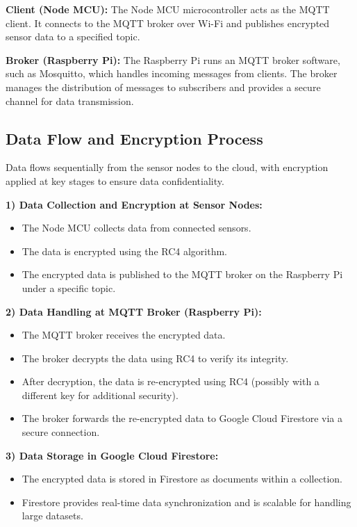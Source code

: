 \documentclass[conference]{IEEEtran}
\begin{document}
\textbf{Client (Node MCU):} The Node MCU microcontroller acts as the MQTT client. It connects to the MQTT broker over Wi-Fi and publishes encrypted sensor data to a specified topic.

\textbf{Broker (Raspberry Pi):} The Raspberry Pi runs an MQTT broker software, such as Mosquitto, which handles incoming messages from clients. The broker manages the distribution of messages to subscribers and provides a secure channel for data transmission.

\subsection{Data Flow and Encryption Process}

Data flows sequentially from the sensor nodes to the cloud, with encryption applied at key stages to ensure data confidentiality.

\textbf{1) Data Collection and Encryption at Sensor Nodes:}
\begin{itemize}
    \item The Node MCU collects data from connected sensors.
    \item The data is encrypted using the RC4 algorithm.
    \item The encrypted data is published to the MQTT broker on the Raspberry Pi under a specific topic.
\end{itemize}

\textbf{2) Data Handling at MQTT Broker (Raspberry Pi):}
\begin{itemize}
    \item The MQTT broker receives the encrypted data.
    \item The broker decrypts the data using RC4 to verify its integrity.
    \item After decryption, the data is re-encrypted using RC4 (possibly with a different key for additional security).
    \item The broker forwards the re-encrypted data to Google Cloud Firestore via a secure connection.
\end{itemize}

\textbf{3) Data Storage in Google Cloud Firestore:}
\begin{itemize}
    \item The encrypted data is stored in Firestore as documents within a collection.
    \item Firestore provides real-time data synchronization and is scalable for handling large datasets.
\end{itemize}
\end{document}
